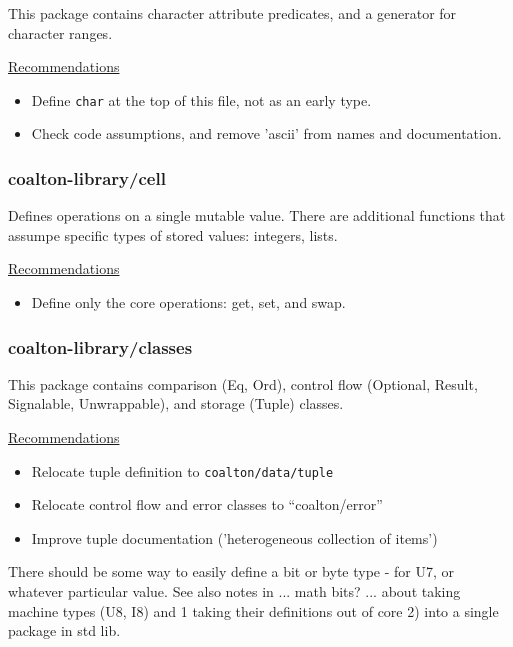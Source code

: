 \documentclass[12pt]{article}
\newcommand{\code}{\texttt}
\begin{document}
This package contains character attribute predicates, and a generator
for character ranges.

\bigskip
\underline{Recommendations}

\begin{itemize}
\item Define \code{char} at the top of this file, not as an early type.
\item Check code assumptions, and remove 'ascii' from names and documentation.
\end{itemize}

\subsubsection{coalton-library/cell}

Defines operations on a single mutable value. There are additional
functions that assumpe specific types of stored values: integers,
lists.

\bigskip
\underline{Recommendations}

\begin{itemize}
\item Define only the core operations: get, set, and swap.
\end{itemize}

\subsubsection{coalton-library/classes}

This package contains comparison (Eq, Ord), control flow (Optional,
Result, Signalable, Unwrappable), and storage (Tuple) classes.

\bigskip
\underline{Recommendations}

\begin{itemize}
\item Relocate tuple definition to \code{coalton/data/tuple}
\item Relocate control flow and error classes to ``coalton/error''
\item Improve tuple documentation ('heterogeneous collection of items')
\end{itemize}



There should be some way to easily define a bit or byte type -
for U7, or whatever particular value. See also notes in ... math bits?
... about taking machine types (U8, I8) and 1 taking their definitions
out of core 2) into a single package in std lib.
\end{document}
